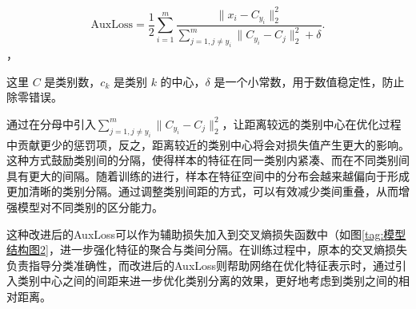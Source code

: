 \[
\text{AuxLoss} = \frac{1}{2} \sum_{i=1}^m \frac{\|x_i - C_{y_i}\|_2^2}{\sum_{j=1, j \neq y_i}^{m} \|C_{y_i} - C_j\|_2^2 + \delta}.
\]，

这里 \( C \) 是类别数，\( c_k \) 是类别 \( k \) 的中心，\( \delta \) 是一个小常数，用于数值稳定性，防止除零错误。

通过在分母中引入$\sum_{j=1, j \neq y_i}^{m} \|C_{y_i} - C_j\|_2^2$，让距离较远的类别中心在优化过程中贡献更少的惩罚项，反之，距离较近的类别中心将会对损失值产生更大的影响。这种方式鼓励类别间的分隔，使得样本的特征在同一类别内紧凑、而在不同类别间具有更大的间隔。随着训练的进行，样本在特征空间中的分布会越来越偏向于形成更加清晰的类别分隔。通过调整类别间距的方式，可以有效减少类间重叠，从而增强模型对不同类别的区分能力。

这种改进后的AuxLoss可以作为辅助损失加入到交叉熵损失函数中（如图\ref{tag:模型结构图2}，进一步强化特征的聚合与类间分隔。在训练过程中，原本的交叉熵损失负责指导分类准确性，而改进后的AuxLoss则帮助网络在优化特征表示时，通过引入类别中心之间的间距来进一步优化类别分离的效果，更好地考虑到类别之间的相对距离。

    

